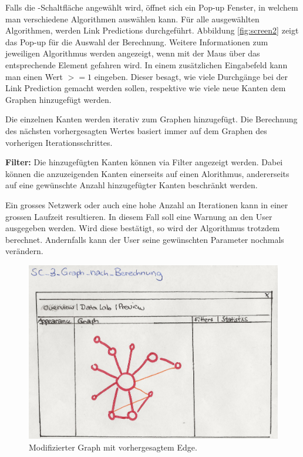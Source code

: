 Falls die -Schaltfläche angewählt wird, öffnet sich ein Pop-up Fenster, in welchem man verschiedene Algorithmen auswählen
kann. Für alle ausgewählten Algorithmen, werden Link Predictions durchgeführt.
Abbildung \ref{fig:screen2} zeigt das Pop-up für die Auswahl der Berechnung.
Weitere Informationen zum jeweiligen Algorithmus werden angezeigt, wenn mit der Maus über das entsprechende Element gefahren wird.
In einem zusätzlichen Eingabefeld kann man einen Wert $>= 1$ eingeben.
Dieser besagt, wie viele Durchgänge bei der Link Prediction gemacht werden sollen, respektive wie viele neue Kanten dem Graphen hinzugefügt werden.

Die einzelnen Kanten werden iterativ zum Graphen hinzugefügt. Die Berechnung des nächsten vorhergesagten Wertes basiert immer auf dem Graphen des vorherigen Iterationsschrittes.

\item \textbf{Filter:} Die hinzugefügten Kanten können via Filter angezeigt werden.
Dabei können die anzuzeigenden Kanten einerseits auf einen Alorithmus, andererseits auf eine gewünschte Anzahl hinzugefügter Kanten beschränkt werden.


Ein grosses Netzwerk oder auch eine hohe Anzahl an Iterationen kann in einer grossen Laufzeit resultieren.
In diesem Fall soll eine Warnung an den User ausgegeben werden. Wird diese bestätigt, so wird der Algorithmus trotzdem berechnet. Andernfalls kann der User seine gewünschten
Parameter nochmals verändern.

\begin{figure}
    \includegraphics[width=\linewidth]{resources/SC-3.png}
    \caption{Modifizierter Graph mit vorhergesagtem Edge.}
    \label{fig:screen3}
\end{figure}

